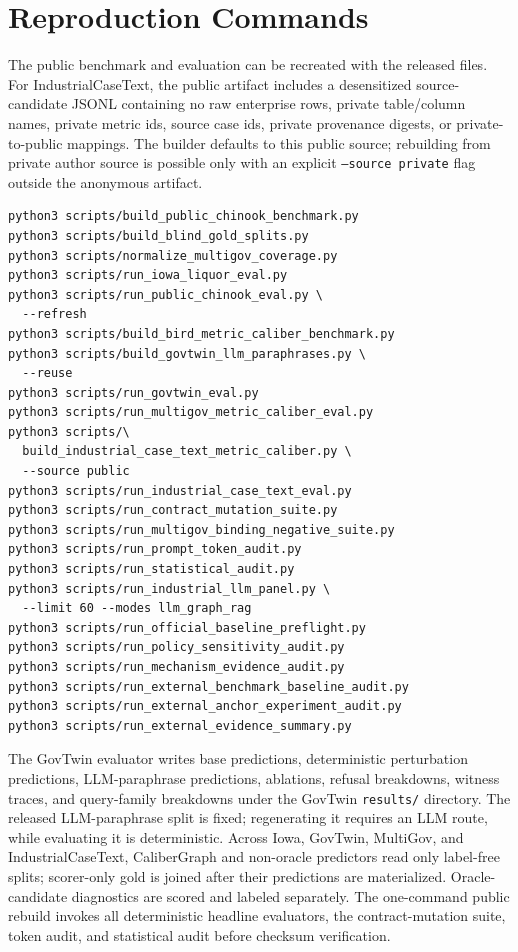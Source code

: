 \documentclass[letterpaper]{article}
\begin{document}
\section{Reproduction Commands}

The public benchmark and evaluation can be recreated with the released files. For IndustrialCaseText, the public artifact includes a desensitized source-candidate JSONL containing no raw enterprise rows, private table/column names, private metric ids, source case ids, private provenance digests, or private-to-public mappings. The builder defaults to this public source; rebuilding from private author source is possible only with an explicit \texttt{--source private} flag outside the anonymous artifact.

\begin{scriptsize}
\begin{verbatim}
python3 scripts/build_public_chinook_benchmark.py
python3 scripts/build_blind_gold_splits.py
python3 scripts/normalize_multigov_coverage.py
python3 scripts/run_iowa_liquor_eval.py
python3 scripts/run_public_chinook_eval.py \
  --refresh
python3 scripts/build_bird_metric_caliber_benchmark.py
python3 scripts/build_govtwin_llm_paraphrases.py \
  --reuse
python3 scripts/run_govtwin_eval.py
python3 scripts/run_multigov_metric_caliber_eval.py
python3 scripts/\
  build_industrial_case_text_metric_caliber.py \
  --source public
python3 scripts/run_industrial_case_text_eval.py
python3 scripts/run_contract_mutation_suite.py
python3 scripts/run_multigov_binding_negative_suite.py
python3 scripts/run_prompt_token_audit.py
python3 scripts/run_statistical_audit.py
python3 scripts/run_industrial_llm_panel.py \
  --limit 60 --modes llm_graph_rag
python3 scripts/run_official_baseline_preflight.py
python3 scripts/run_policy_sensitivity_audit.py
python3 scripts/run_mechanism_evidence_audit.py
python3 scripts/run_external_benchmark_baseline_audit.py
python3 scripts/run_external_anchor_experiment_audit.py
python3 scripts/run_external_evidence_summary.py
\end{verbatim}
\end{scriptsize}

The GovTwin evaluator writes base predictions, deterministic perturbation predictions, LLM-paraphrase predictions, ablations, refusal breakdowns, witness traces, and query-family breakdowns under the GovTwin \texttt{results/} directory. The released LLM-paraphrase split is fixed; regenerating it requires an LLM route, while evaluating it is deterministic. Across Iowa, GovTwin, MultiGov, and IndustrialCaseText, CaliberGraph and non-oracle predictors read only label-free splits; scorer-only gold is joined after their predictions are materialized. Oracle-candidate diagnostics are scored and labeled separately. The one-command public rebuild invokes all deterministic headline evaluators, the contract-mutation suite, token audit, and statistical audit before checksum verification.
\end{document}
